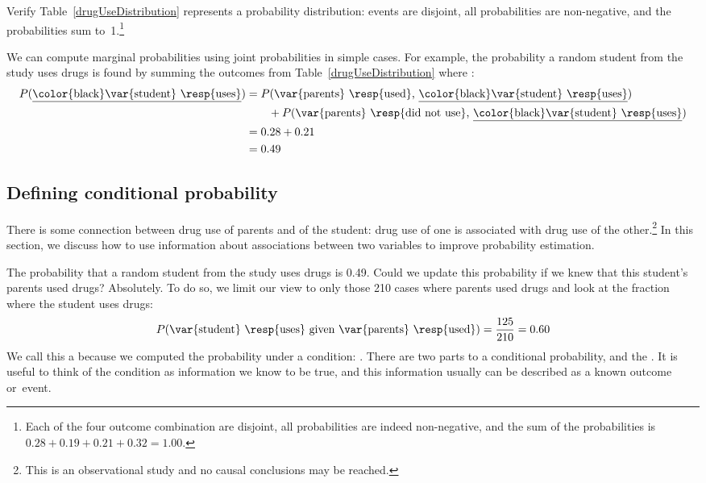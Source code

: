 \begin{exercise}
Verify Table~\ref{drugUseDistribution} represents a probability distribution: events are disjoint, all probabilities are non-negative, and the probabilities sum to~1.\footnote{Each of the four outcome combination are disjoint, all probabilities are indeed non-negative, and the sum of the probabilities is $0.28 + 0.19 + 0.21 + 0.32 = 1.00$.}
\end{exercise}

We can compute marginal probabilities using joint probabilities in simple cases. For example, the probability a random student from the study uses drugs is found by summing the outcomes from Table~\ref{drugUseDistribution} where  :
\begin{align*}
P(\text{\underline{\color{black}\var{student} \resp{uses}}})
&=  P(\text{\var{parents} \resp{used}, \underline{\color{black}\var{student} \resp{uses}}}) \\
& \quad \quad + P(\text{\var{parents} \resp{did not use}, \underline{\color{black}\var{student} \resp{uses}}}) \\
&= 0.28 + 0.21 \\
&= 0.49
\end{align*}


\subsection{Defining conditional probability}


There is some connection between drug use of parents and of the student: drug use of one is associated with drug use of the other.\footnote{This is an observational study and no causal conclusions may be reached.} In this section, we discuss how to use information about associations between two variables to improve probability estimation.

The probability that a random student from the study uses drugs is 0.49. Could we update this probability if we knew that this student's parents used drugs? Absolutely. To do so, we limit our view to only those 210 cases where parents used drugs and look at the fraction where the student uses drugs:
\begin{eqnarray*}
P(\text{\var{student} \resp{uses} given \var{parents} \resp{used}}) = \frac{125}{210} = 0.60
\end{eqnarray*}
We call this a  because we computed the probability under a condition:  . There are two parts to a conditional probability,  and the . It is useful to think of the condition as information we know to be true, and this information usually can be described as a known outcome or~event.

